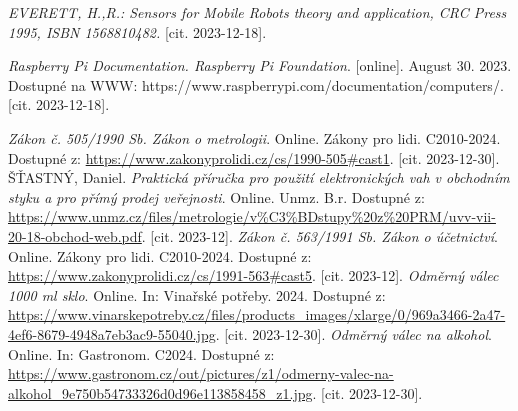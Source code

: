 \begin{thebibliography}{19}

\textit{EVERETT, H.,R.: Sensors for Mobile Robots theory and application, CRC Press 1995, ISBN 1568810482.} [cit. 2023-12-18].

\textit{Raspberry Pi Documentation. Raspberry Pi Foundation}. [online]. August 30. 2023. Dostupné na WWW: {https://www.raspberrypi.com/documentation/computers/}. [cit. 2023-12-18].


\textit{Zákon č. 505/1990 Sb. Zákon o metrologii}. Online. Zákony pro lidi. C2010-2024. Dostupné z: \url{https://www.zakonyprolidi.cz/cs/1990-505\#cast1}. [cit. 2023-12-30].
ŠŤASTNÝ, Daniel. \textit{Praktická příručka pro použití elektronických vah v obchodním styku a pro přímý prodej veřejnosti}. Online. Unmz. B.r. Dostupné z: \url{https://www.unmz.cz/files/metrologie/v\%C3\%BDstupy\%20z\%20PRM/uvv-vii-20-18-obchod-web.pdf}. [cit. 2023-12].
\textit{Zákon č. 563/1991 Sb. Zákon o účetnictví}. Online. Zákony pro lidi. C2010-2024. Dostupné z: \url{https://www.zakonyprolidi.cz/cs/1991-563\#cast5}. [cit. 2023-12].
\textit{Odměrný válec 1000 ml sklo}. Online. In: Vinařské potřeby. 2024. Dostupné z: \url{https://www.vinarskepotreby.cz/files/products\_images/xlarge/0/969a3466-2a47-4ef6-8679-4948a7eb3ac9-55040.jpg}. [cit. 2023-12-30].
\textit{Odměrný válec na alkohol}. Online. In: Gastronom. C2024. Dostupné z: \url{https://www.gastronom.cz/out/pictures/z1/odmerny-valec-na-alkohol\_9e750b54733326d0d96e113858458\_z1.jpg}. [cit. 2023-12-30].

\end{thebibliography}
